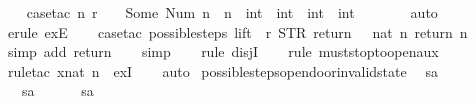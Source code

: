 \begin{isabellebody}
\ \ \isamarkupfalse%
\ {\isacharparenleft}case{\isacharunderscore}tac\ {\isachardoublequoteopen}{\isasymexists}n{\isachardot}\ r\ {\isachardollar}\ {}\ {\isacharequal}\ Some\ {\isacharparenleft}Num\ n{\isacharparenright}\ {\isasymand}\ n\ {\isasymin}\ {\isacharbraceleft}int\ {}{\isacharcomma}\ int\ {}{\isacharcomma}\ int\ {}{\isacharcomma}\ int\ {}{\isacharbraceright}{\isachardoublequoteclose}{\isacharparenright}\isanewline
\ \ \ \isamarkupfalse%
\ \isamarkupfalse%
\ auto{\isacharbrackleft}{}{\isacharbrackright}\isanewline
\ \ \isamarkupfalse%
\ {\isacharparenleft}erule\ exE{\isacharparenright}\isanewline
\ \ \isamarkupfalse%
\ {\isacharparenleft}case{\isacharunderscore}tac\ {\isachardoublequoteopen}possible{\isacharunderscore}steps\ lift\ {}\ r\ {\isacharparenleft}STR\ {\isacharprime}{\isacharprime}return{\isacharprime}{\isacharprime}{\isacharparenright}\ {\isacharbrackleft}{\isacharbrackright}\ {\isacharequal}\ {\isacharbraceleft}{\isacharbar}{\isacharparenleft}nat\ n{\isacharcomma}\ return\ n{\isacharparenright}{\isacharbar}{\isacharbraceright}{\isachardoublequoteclose}{\isacharparenright}\isanewline
\ \ \ \isamarkupfalse%
\ \isamarkupfalse%
\ {\isacharparenleft}simp\ add{\isacharcolon}\ return{\isacharparenright}\isanewline
\ \ \isamarkupfalse%
\ simp\isanewline
\ \ \isamarkupfalse%
\ {\isacharparenleft}rule\ disjI{}{\isacharparenright}\isanewline
\ \ \isamarkupfalse%
\ {\isacharparenleft}rule\ must{\isacharunderscore}stop{\isacharunderscore}to{\isacharunderscore}open{\isacharunderscore}aux{}{\isacharparenright}\isanewline
\ \ \isamarkupfalse%
\ {\isacharparenleft}rule{\isacharunderscore}tac\ x{\isacharequal}{\isachardoublequoteopen}nat\ n{\isachardoublequoteclose}\ \ exI{\isacharparenright}\isanewline
\ \ \isamarkupfalse%
\ auto%
\endisatagproof
{\isafoldproof}%
%
\isadelimproof
\isanewline
%
\endisadelimproof
\isanewline
{}\isamarkupfalse%
\ possible{\isacharunderscore}steps{\isacharunderscore}opendoor{\isacharunderscore}invalid{\isacharunderscore}state{\isacharcolon}\isanewline
\ \ {\isachardoublequoteopen}sa\ {\isasymnoteq}\ {}\ {\isasymLongrightarrow}\isanewline
\ \ \ sa\ {\isasymnoteq}\ {}\ {\isasymLongrightarrow}\isanewline
\ \ \ sa\ {\isasymnoteq}\ {}\ {\isasymLongrightarrow}\isanewline

\end{isabellebody}
